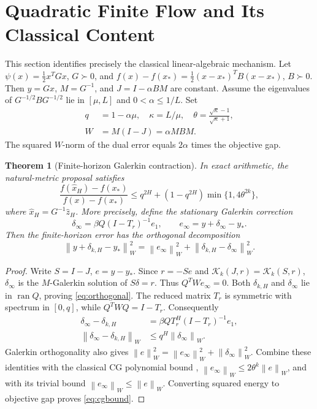 \documentclass[journal]{IEEEtran}
\newtheorem{theorem}{Theorem}
\theoremstyle{definition}
\newcommand{\norm}[1]{\left\lVert#1\right\rVert}
\newcommand{\K}{\mathcal{K}}
\begin{document}
\section{Quadratic Finite Flow and Its Classical Content}
\label{app:cg}
This section identifies precisely the classical linear-algebraic mechanism.
Let $\psi(x)=\tfrac12x^TGx$, $G\succ0$, and
$f(x)-f(x_*)=\tfrac12(x-x_*)^TB(x-x_*)$, $B\succ0$.
Then $y=Gx$, $M=G^{-1}$, and $J=I-\alpha BM$ are constant.
Assume the eigenvalues of $G^{-1/2}BG^{-1/2}$ lie in $[\mu,L]$ and
$0<\alpha\leq 1/L$. Set
\begin{equation}\begin{aligned}
 q&=1-\alpha\mu,\quad \kappa=L/\mu,\quad
 \theta=\frac{\sqrt\kappa-1}{\sqrt\kappa+1},\\
 W&=M(I-J)=\alpha MBM.
\end{aligned}\label{eq:quadparams}\end{equation}
The squared $W$-norm of the dual error equals $2\alpha$ times the objective gap.

\begin{theorem}[Finite-horizon Galerkin contraction]\label{thm:cg}
In exact arithmetic, the natural-metric proposal satisfies
\begin{equation}
 \frac{f(\widehat x_H)-f(x_*)}{f(x)-f(x_*)}
 \leq q^{2H}+(1-q^{2H})\min\{1,4\theta^{2k}\},
 \label{eq:cgbound}
\end{equation}
where $\widehat x_H=G^{-1}\widehat z_H$.
More precisely, define the stationary Galerkin correction
\[
 \delta_\infty=\beta Q(I-T_r)^{-1}e_1,
 \qquad e_\infty=y+\delta_\infty-y_*.
\]
Then the finite-horizon error has the orthogonal decomposition
\begin{equation}
 \norm{y+\delta_{k,H}-y_*}_W^2
 =\norm{e_\infty}_W^2+
   \norm{\delta_{k,H}-\delta_\infty}_W^2. \label{eq:orthogonal}
\end{equation}
\end{theorem}
\begin{proof}
Write $S=I-J$, $e=y-y_*$. Since $r=-Se$ and
$\K_k(J,r)=\K_k(S,r)$, $\delta_\infty$ is the $M$-Galerkin solution of
$S\delta=r$. Thus $Q^TWe_\infty=0$. Both $\delta_{k,H}$ and
$\delta_\infty$ lie in $\operatorname{ran}Q$, proving
\eqref{eq:orthogonal}. The reduced matrix $T_r$ is symmetric with spectrum
in $[0,q]$, while $Q^TWQ=I-T_r$. Consequently
\begin{align*}
 \delta_\infty-\delta_{k,H}&=\beta QT_r^H(I-T_r)^{-1}e_1,\\
 \norm{\delta_\infty-\delta_{k,H}}_W&\leq q^H\norm{\delta_\infty}_W.
\end{align*}
Galerkin orthogonality also gives
$\norm{e}_W^2=\norm{e_\infty}_W^2+\norm{\delta_\infty}_W^2$.
Combine these identities with the classical CG polynomial bound
\cite{saadbook},
$\norm{e_\infty}_W\leq 2\theta^k\norm{e}_W$,
and with its trivial bound $\norm{e_\infty}_W\leq\norm{e}_W$.
Converting squared energy to objective gap proves \eqref{eq:cgbound}.
\end{proof}
\end{document}
